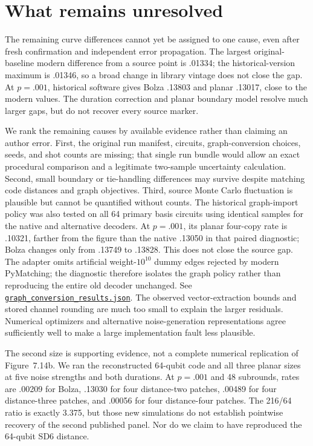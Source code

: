 \documentclass[11pt]{article}
\newcommand{\file}[2]{\href{https://github.com/alectionary/vibe-math/blob/master/formalization/higgott-quantum-decoding/#1}{\nolinkurl{#2}}}
\begin{document}
\section{What remains unresolved}
The remaining curve differences cannot yet be assigned to one cause, even after fresh confirmation and independent error propagation. The largest original-baseline modern difference from a source point is .01334; the historical-version maximum is .01346, so a broad change in library vintage does not close the gap. At $p=.001$, historical software gives Bolza .13803 and planar .13017, close to the modern values. The duration correction and planar boundary model resolve much larger gaps, but do not recover every source marker.

We rank the remaining causes by available evidence rather than claiming an author error. First, the original run manifest, circuits, graph-conversion choices, seeds, and shot counts are missing; that single run bundle would allow an exact procedural comparison and a legitimate two-sample uncertainty calculation. Second, small boundary or tie-handling differences may survive despite matching code distances and graph objectives. Third, source Monte Carlo fluctuation is plausible but cannot be quantified without counts. The historical graph-import policy was also tested on all 64 primary basis circuits using identical samples for the native and alternative decoders. At $p=.001$, its planar four-copy rate is .10321, farther from the figure than the native .13050 in that paired diagnostic; Bolza changes only from .13749 to .13828. This does not close the source gap. The adapter omits artificial weight-$10^{10}$ dummy edges rejected by modern PyMatching; the diagnostic therefore isolates the graph policy rather than reproducing the entire old decoder unchanged. See \file{provenance/graph_conversion_results.json}{graph_conversion_results.json}. The observed vector-extraction bounds and stored channel rounding are much too small to explain the larger residuals. Numerical optimizers and alternative noise-generation representations agree sufficiently well to make a large implementation fault less plausible.

The second size is supporting evidence, not a complete numerical replication of Figure~7.14b. We ran the reconstructed 64-qubit code and all three planar sizes at five noise strengths and both durations. At $p=.001$ and 48 subrounds, rates are .00209 for Bolza, .13030 for four distance-two patches, .00489 for four distance-three patches, and .00056 for four distance-four patches. The 216/64 ratio is exactly 3.375, but those new simulations do not establish pointwise recovery of the second published panel. Nor do we claim to have reproduced the 64-qubit SD6 distance.
\end{document}
